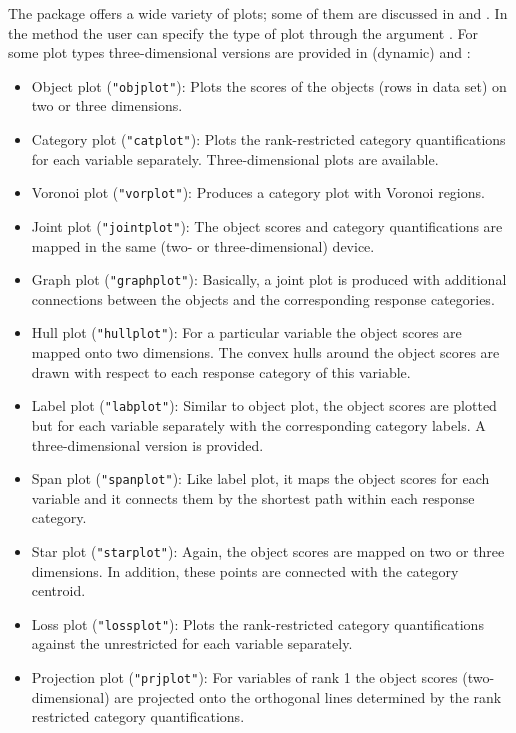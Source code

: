 \documentclass[article, nojss]{jss}
\begin{document}
The package offers a wide variety of plots; some of them are discussed in \citet{Michailidis+deLeeuw:98} and \citet{ Michailidis+deLeeuw:01}. In the  method the user can specify the type of plot through the argument . For some plot types three-dimensional versions are provided in  (dynamic) and :
\begin{itemize}
\item Object plot (\texttt{"objplot"}): Plots the scores of the objects (rows in data set) on two or three dimensions. 
\item Category plot (\texttt{"catplot"}): Plots the rank-restricted category quantifications for each variable separately. Three-dimensional plots are available.
\item Voronoi plot (\texttt{"vorplot"}): Produces a category plot with Voronoi regions.
\item Joint plot (\texttt{"jointplot"}): The object scores and category quantifications are mapped in the same (two- or three-dimensional) device.
\item Graph plot (\texttt{"graphplot"}): Basically, a joint plot is produced with additional connections between the objects and the corresponding response categories.
\item Hull plot (\texttt{"hullplot"}): For a particular variable the object scores are mapped onto two dimensions. The convex hulls around the object scores are drawn with respect to each response category of this variable. 
\item Label plot (\texttt{"labplot"}): Similar to object plot, the object scores are plotted but for each variable separately with the corresponding category labels. A three-dimensional version is provided.
\item Span plot (\texttt{"spanplot"}): Like label plot, it maps the object scores for each variable and it connects them by the shortest path within each response category.
\item Star plot (\texttt{"starplot"}): Again, the object scores are mapped on two or three dimensions. In addition, these points are connected with the category centroid. 
\item Loss plot (\texttt{"lossplot"}): Plots the rank-restricted category quantifications against the unrestricted for each variable separately.
\item Projection plot (\texttt{"prjplot"}): For variables of rank 1 the object scores (two-dimensional) are projected onto
the orthogonal lines determined by the rank restricted category quantifications.  

\end{itemize}
\end{document}
